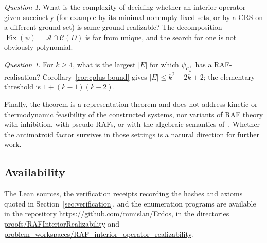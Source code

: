 \documentclass[11pt,a4paper]{article}
\theoremstyle{plain}
\theoremstyle{definition}
\theoremstyle{remark}
\newtheorem{question}[theorem]{Question}
\newcommand{\Fix}{\operatorname{Fix}}
\newcommand{\cA}{\mathcal{A}}
\newcommand{\cC}{\mathcal{C}}
\newcommand{\Cplus}[1]{\cC^{+}_{#1}}
\begin{document}
\begin{question}
What is the complexity of deciding whether an interior operator given succinctly (for example by its minimal nonempty fixed sets, or by a CRS on a different ground set) is same-ground realizable? The decomposition $\Fix(\psi)=\cA\cap\cC(D)$ is far from unique, and the search for one is not obviously polynomial.
\end{question}

\begin{question}
For $k\ge4$, what is the largest $|E|$ for which $\psi_{\Cplus{k}}$ has a RAF-realisation? Corollary~\ref{cor:cplus-bound} gives $|E|\le k^2-2k+2$; the elementary threshold is $1+(k-1)(k-2)$.
\end{question}

Finally, the theorem is a representation theorem and does not address kinetic or thermodynamic feasibility of the constructed systems, nor variants of RAF theory with inhibition, with pseudo-RAFs, or with the algebraic semantics of~\cite{loutchko2023algebraic}. Whether the antimatroid factor survives in those settings is a natural direction for further work.

\subsection*{Availability}

The Lean sources, the verification receipts recording the hashes and axioms quoted in Section~\ref{sec:verification}, and the enumeration programs are available in the repository \url{https://github.com/mmislan/Erdos}, in the directories \url{proofs/RAFInteriorRealizability} and \url{problem_workspaces/RAF_interior_operator_realizability}.



\end{document}
